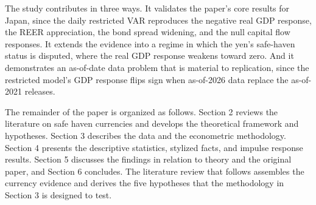 The study contributes in three ways. It validates the paper's core results for Japan, since the daily restricted VAR reproduces the negative real GDP response, the REER appreciation, the bond spread widening, and the null capital flow responses. It extends the evidence into a regime in which the yen's safe-haven status is disputed, where the real GDP response weakens toward zero. And it demonstrates an as-of-date data problem that is material to replication, since the restricted model's GDP response flips sign when as-of-2026 data replace the as-of-2021 releases.

The remainder of the paper is organized as follows. Section 2 reviews the literature on safe haven currencies and develops the theoretical framework and hypotheses. Section 3 describes the data and the econometric methodology. Section 4 presents the descriptive statistics, stylized facts, and impulse response results. Section 5 discusses the findings in relation to theory and the original paper, and Section 6 concludes. The literature review that follows assembles the currency evidence and derives the five hypotheses that the methodology in Section 3 is designed to test.
